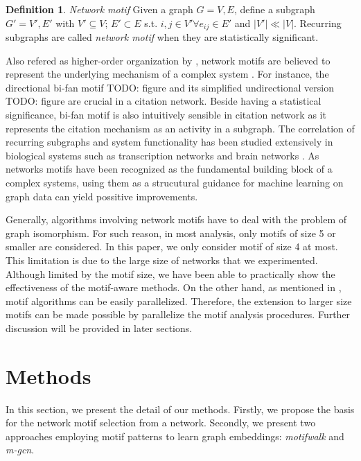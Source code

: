 \documentclass{article}
\theoremstyle{definition}
\newtheorem{definition}{Definition}[section]
\begin{document}
\begin{definition}{\emph{Network motif}}
Given a graph $G = {V,E}$, define a subgraph $G' = {V', E'}$ with $V' \subseteq V$;
$E' \subset E$ s.t. $i,j \in V' \forall e_{ij} \in E'$ and $|V'| \ll |V|$. Recurring subgraphs
are called \emph{network motif} when they are statistically significant.
\end{definition}

Also refered as higher-order organization by \citeauthor{juremotif}, network motifs
are believed to represent the underlying mechanism of a complex system 
\cite{netmotif,alon2006introduction,mangan2003structure}. 
For instance, the directional bi-fan motif TODO: figure
and its simplified undirectional version TODO: figure are crucial in a citation network. 
Beside having a statistical significance, bi-fan motif is also intuitively 
sensible in citation network as it represents the citation mechanism as an activity
in a subgraph. The correlation of recurring subgraphs and system functionality has 
been studied extensively in biological systems such as 
transcription networks \cite{mangan2003structure} and brain 
networks \cite{brainnetheuvel,honey2007network}. As networks motifs
have been recognized as the fundamental building block of a complex
systems, using them as a strucutural guidance for machine learning
on graph data can yield possitive improvements.

Generally, algorithms involving network motifs have to deal with
the problem of graph isomorphism. For such reason, in most analysis,
only motifs of size 5 or smaller are considered. In this paper,
we only consider motif of size 4 at most. This limitation is due to
the large size of networks that we experimented. Although limited 
by the motif size, we have been able to practically show the effectiveness of
the motif-aware methods. On the other hand, as mentioned in \cite{juremotif},
motif algorithms can be easily parallelized. Therefore, the extension to
larger size motifs can be made possible by parallelize the motif
analysis procedures. Further discussion will be provided in later sections.

\section{Methods}

In this section, we present the detail of our methods. Firstly,
we propose the basis for the network motif selection from a network.
Secondly, we present two approaches employing motif patterns to
learn graph embeddings: \emph{motifwalk} and \emph{m-gcn}.
\end{document}
